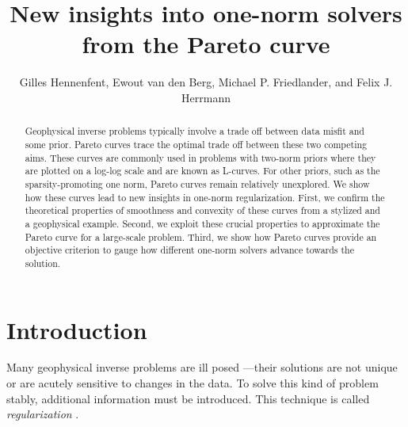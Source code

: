 \author{Gilles Hennenfent\footnotemark[1], Ewout van den
  Berg\footnotemark[2], Michael P. Friedlander\footnotemark[2], and
  Felix J. Herrmann\footnotemark[1]}



\title{New insights into one-norm solvers from the Pareto curve}

\footer{}
\maketitle

\begin{abstract}
  Geophysical inverse problems typically involve a trade off between
  data misfit and some prior. Pareto curves trace the optimal trade
  off between these two competing aims. These curves are commonly used
  in problems with two-norm priors where they are plotted on a log-log
  scale and are known as L-curves. For other priors, such as the
  sparsity-promoting one norm, Pareto curves remain relatively
  unexplored. We show how these curves lead to new insights in
  one-norm regularization. First, we confirm the theoretical
  properties of smoothness and convexity of these curves from a
  stylized and a geophysical example. Second, we exploit these crucial
  properties to approximate the Pareto curve for a large-scale
  problem. Third, we show how Pareto curves provide an objective
  criterion to gauge how different one-norm solvers advance towards
  the solution.
\end{abstract}

\section{Introduction}

\mbox{}\indent Many geophysical inverse problems are ill posed
\cite[][]{parker94}---their solutions are not unique or are acutely
sensitive to changes in the data. To solve this kind of problem
stably, additional information must be introduced. This technique is
called \textit{regularization} \cite[see,
e.g.,][]{phillips62,tikhonov63}.

